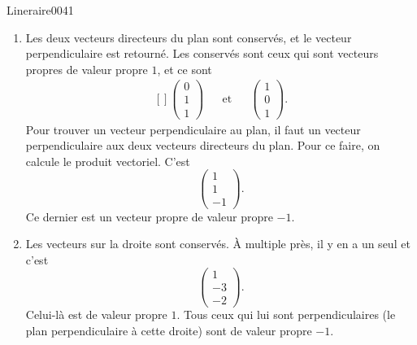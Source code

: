 \begin{corrige}{Lineraire0041}

	\begin{enumerate}

		\item
			


	Les deux vecteurs directeurs du plan sont conservés, et le vecteur perpendiculaire est retourné. Les conservés sont ceux qui sont vecteurs propres de valeur propre $1$, et ce sont
	\begin{equation}
		\begin{aligned}[]
			\begin{pmatrix}
				0	\\ 
				1	\\ 
				1	
			\end{pmatrix}&&\text{et}&&\begin{pmatrix}
				1	\\ 
				0	\\ 
				1	
			\end{pmatrix}.
		\end{aligned}
	\end{equation}
	Pour trouver un vecteur perpendiculaire au plan, il faut un vecteur perpendiculaire aux deux vecteurs directeurs du plan. Pour ce faire, on calcule le produit vectoriel. C'est
	\begin{equation}
		\begin{pmatrix}
			1	\\ 
			1	\\ 
			-1	
		\end{pmatrix}.
	\end{equation}
	Ce dernier est un vecteur propre de valeur propre $-1$.

\item
	Les vecteurs sur la droite sont conservés. À multiple près, il y en a un seul et c'est
	\begin{equation}
		\begin{pmatrix}
			1	\\ 
			-3	\\ 
			-2	
		\end{pmatrix}.
	\end{equation}
	Celui-là est de valeur propre $1$. Tous ceux qui lui sont perpendiculaires (le plan perpendiculaire à cette droite) sont de valeur propre $-1$.

	\end{enumerate}


\end{corrige}
